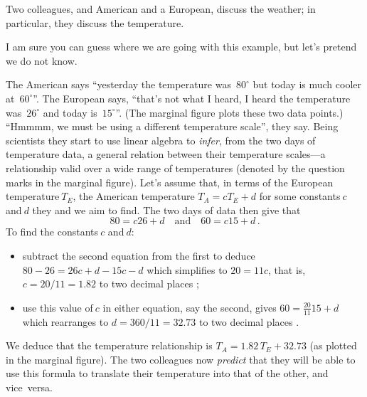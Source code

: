 \begin{example} \label{eg:infertemp}
Two colleagues, and American and a European, discuss the weather; in particular, they discuss the temperature.
\begin{aside}
I am sure you can guess where we are going with this example, but let's pretend we do not know.
\end{aside}
The American says ``yesterday the temperature was~\(80^\circ\) but today is much cooler at~\(60^\circ\)''.
The European says, ``that's not what I heard, I heard the temperature was~\(26^\circ\) and today is~\(15^\circ\)''.
(The marginal figure plots these two data points.)
%
``Hmmmm, we must be using a different temperature scale'', they say.
Being scientists they start to use linear algebra to \emph{infer}, from the two days of temperature data, a general relation between their temperature scales---a relationship valid over a wide range of temperatures (denoted by the question marks in the marginal figure).
Let's assume that, in terms of the European temperature\(~T_E\), the American temperature \(T_A=cT_E+d\) for some constants\(~c\) and\(~d\) they and we aim to find.
The two days of data then give that
\begin{equation*}
80=c26+d\quad\text{and}\quad 60=c15+d\,.
\end{equation*}
To find the constants\(~c\) and\(~d\):
\begin{itemize}
\item subtract the second equation from the first to deduce \(80-26=26c+d-15c-d\) which simplifies to \(20=11c\), that is, \(c=20/11=1.82\) to two decimal places \twodp;
\item use this value of\(~c\) in either equation, say the second, gives \(60=\frac{20}{11}15+d\) which rearranges to \(d=360/11=32.73\)  to two decimal places \twodp.
\end{itemize}
%
We deduce that the temperature relationship is \(T_A=1.82\,T_E+32.73\) (as plotted in the marginal figure).
The two colleagues now \emph{predict} that they will be able to use this formula to translate their temperature into that of the other, and vice~versa.


\end{example}
